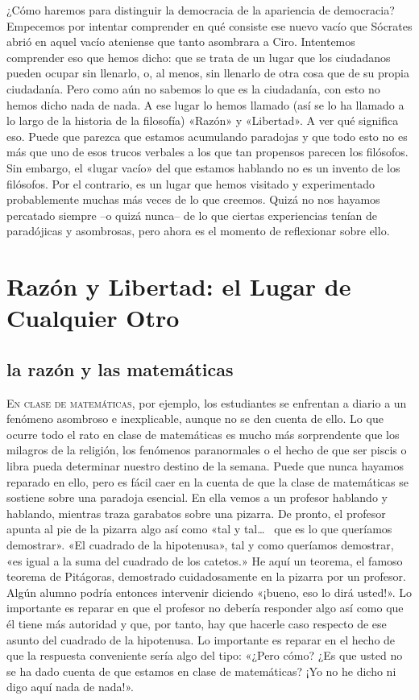 \documentclass[draft,9pt,letterpaper,twocolumn,openany]{extbook}
\newcommand*\initfamily{\usefont{U}{Zallman}{xl}{n}}
\newcommand{\dcap}[2]{
	 \lettrine[nindent=0em,findent=2pt,lines=3,loversize=-0.10]{\initfamily #1}{#2}
 }
\newcommand{\notar}[1]{\marginnote{\small\sffamily #1}[-.8em]}
\begin{document}
¿Cómo haremos para distinguir la democracia de la
apariencia de democracia? Empecemos por intentar
comprender en qué consiste ese nuevo vacío que Sócrates
abrió en aquel vacío ateniense que tanto asombrara a Ciro.
Intentemos comprender eso que hemos dicho: que se trata
de un lugar que los ciudadanos pueden ocupar sin llenarlo,
o, al menos, sin llenarlo de otra cosa que de su propia
ciudadanía. Pero como aún no sabemos lo que es la
ciudadanía, con esto no hemos dicho nada de nada. A ese
lugar lo hemos llamado (así se lo ha llamado a lo largo de
la historia de la filosofía) «Razón» y «Libertad». A ver qué
significa eso. Puede que parezca que estamos acumulando
paradojas y que todo esto no es más que uno de esos
trucos verbales a los que tan propensos parecen los
filósofos. Sin embargo, el «lugar vacío» del que estamos
hablando no es un invento de los filósofos. Por el contrario,
es un lugar que hemos visitado y experimentado
probablemente muchas más veces de lo que creemos.
Quizá no nos hayamos percatado siempre –o quizá nunca–
de lo que ciertas experiencias tenían de paradójicas y
asombrosas, pero ahora es el momento de reflexionar
sobre ello.

\chapter{ Razón y Libertad: el Lugar de Cualquier Otro }

\section{la razón y las matemáticas}
\dcap{E}{n clase de matemáticas,}por ejemplo, los estudiantes
se enfrentan a diario a un fenómeno asombroso
e inexplicable, aunque no se den cuenta de ello. Lo que
ocurre todo el rato en clase de matemáticas es mucho
más sorprendente que los milagros de la religión,
los fenómenos paranormales o el hecho de que ser piscis
o libra pueda determinar nuestro destino de la semana.
Puede que nunca hayamos reparado en ello, pero es
fácil caer en la cuenta de que la clase de matemáticas
se sostiene sobre una paradoja esencial. En ella vemos
a un profesor hablando y hablando, mientras traza
garabatos sobre una pizarra. De pronto, el profesor
apunta al pie de la pizarra algo así como «tal y tal\ldots~ que
es lo que queríamos demostrar». «El cuadrado de la
hipotenusa», tal y como queríamos demostrar, «es igual
a la suma del cuadrado de los catetos.» He aquí un
teorema, el famoso teorema de Pitágoras, demostrado
cuidadosamente en la pizarra por un profesor. Algún
alumno podría entonces intervenir diciendo «¡bueno, eso
lo dirá usted!». Lo importante es reparar en que el
profesor no debería responder algo así como que él tiene
más autoridad y que, por tanto, hay que hacerle caso
respecto de ese asunto del cuadrado de la hipotenusa.
Lo importante es reparar en el hecho de que la respuesta
conveniente sería algo del tipo: «¿Pero cómo? ¿Es que
usted no se ha dado cuenta de que estamos en clase
de matemáticas? ¡Yo no he dicho ni digo aquí nada de
nada!».
\end{document}
